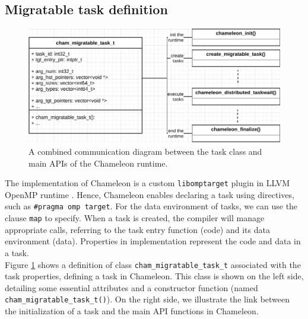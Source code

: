 
\subsection{Migratable task definition}
\label{subsec:migratable_task}

\begin{figure}[t]
	\centering
	\includegraphics[scale=0.725]{./pictures/poc_implementation/poc_chameleon_class_and_comm_diagram.pdf}
	\caption{A combined communication diagram between the task class and main APIs of the Chameleon runtime.}
	\label{fig:poc_chameleon_class_comm_diagram}
\end{figure}

The implementation of Chameleon is a custom \texttt{libomptarget} plugin in LLVM OpenMP runtime \cite{llvm2013omp}. Hence, Chameleon enables declaring a task using directives, such as \texttt{\#pragma omp target}. For the data environment of tasks, we can use the clause \texttt{map} to specify. When a task is created, the compiler will manage appropriate calls, referring to the task entry function (code) and its data environment (data). Properties in implementation represent the code and data in a task.\\

Figure \ref{fig:poc_chameleon_class_comm_diagram} shows a definition of class \texttt{cham\_migratable\_task\_t} associated with the task properties, defining a task in Chameleon. This class is shown on the left side, detailing some essential attributes and a constructor function (named \texttt{cham\_migratable\_task\_t()}). On the right side, we illustrate the link between the initialization of a task and the main API functions in Chameleon.\\

